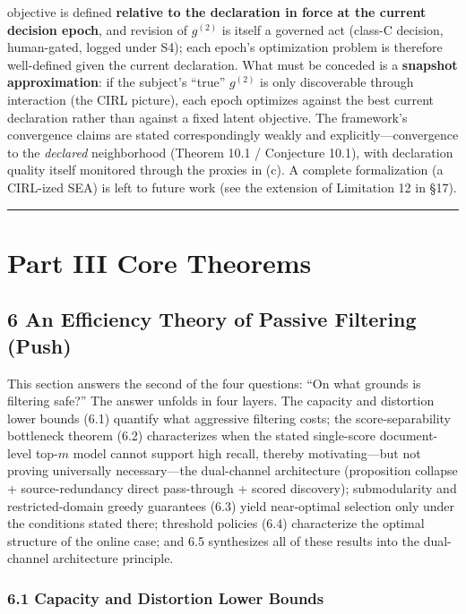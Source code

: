 \documentclass[
  11pt]{article}
\begin{document}
objective is defined \textbf{relative to the declaration in force at the
current decision epoch}, and revision of \(g^{(2)}\) is itself a
governed act (class-C decision, human-gated, logged under S4); each
epoch's optimization problem is therefore well-defined given the current
declaration. What must be conceded is a \textbf{snapshot approximation}:
if the subject's ``true'' \(g^{(2)}\) is only discoverable through
interaction (the CIRL picture), each epoch optimizes against the best
current declaration rather than against a fixed latent objective. The
framework's convergence claims are stated correspondingly weakly and
explicitly---convergence to the \emph{declared} neighborhood (Theorem
10.1 / Conjecture 10.1), with declaration quality itself monitored
through the proxies in (c). A complete formalization (a CIRL-ized SEA)
is left to future work (see the extension of Limitation 12 in §17).

\begin{center}\rule{0.5\linewidth}{0.5pt}\end{center}

\section{Part III Core Theorems}\label{part-iii-core-theorems}

\subsection{6 An Efficiency Theory of Passive Filtering
(Push)}\label{an-efficiency-theory-of-passive-filtering-push}

This section answers the second of the four questions: ``On what grounds
is filtering safe?'' The answer unfolds in four layers. The capacity and
distortion lower bounds (6.1) quantify what aggressive filtering costs;
the score-separability bottleneck theorem (6.2) characterizes when the
stated single-score document-level top-\(m\) model cannot support high
recall, thereby motivating---but not proving universally necessary---the
dual-channel architecture (proposition collapse + source-redundancy
direct pass-through + scored discovery); submodularity and
restricted-domain greedy guarantees (6.3) yield near-optimal selection
only under the conditions stated there; threshold policies (6.4)
characterize the optimal structure of the online case; and 6.5
synthesizes all of these results into the dual-channel architecture
principle.

\subsubsection{6.1 Capacity and Distortion Lower
Bounds}\label{capacity-and-distortion-lower-bounds}
\end{document}
